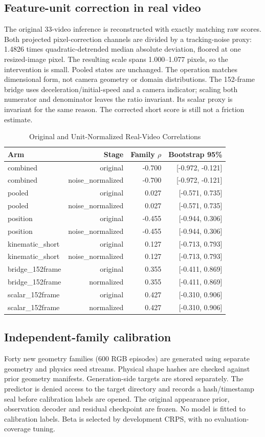 \subsection{Feature-unit correction in real video}
The original 33-video inference is reconstructed with exactly matching raw scores. Both projected pixel-correction channels are divided by a tracking-noise proxy: 1.4826 times quadratic-detrended median absolute deviation, floored at one resized-image pixel. The resulting scale spans 1.000--1.077 pixels, so the intervention is small. Pooled states are unchanged. The operation matches dimensional form, not camera geometry or domain distributions. The 152-frame bridge uses deceleration/initial-speed and a camera indicator; scaling both numerator and denominator leaves the ratio invariant. Its scalar proxy is invariant for the same reason. The corrected short score is still not a friction estimate.

\begin{table}[htbp]\centering\small
\caption{Original and Unit-Normalized Real-Video Correlations}\label{tab:fu_real}
\begin{tabular}{lrrr}\toprule
Arm & Stage & Family $\rho$ & Bootstrap 95\%\\\midrule
combined & original & -0.700 & [-0.972, -0.121]\\
combined & noise\_normalized & -0.700 & [-0.972, -0.121]\\
pooled & original & 0.027 & [-0.571, 0.735]\\
pooled & noise\_normalized & 0.027 & [-0.571, 0.735]\\
position & original & -0.455 & [-0.944, 0.306]\\
position & noise\_normalized & -0.455 & [-0.944, 0.306]\\
kinematic\_short & original & 0.127 & [-0.713, 0.793]\\
kinematic\_short & noise\_normalized & 0.127 & [-0.713, 0.793]\\
bridge\_152frame & original & 0.355 & [-0.411, 0.869]\\
bridge\_152frame & normalized & 0.355 & [-0.411, 0.869]\\
scalar\_152frame & original & 0.427 & [-0.310, 0.906]\\
scalar\_152frame & normalized & 0.427 & [-0.310, 0.906]\\
\bottomrule\end{tabular}
\end{table}
\subsection{Independent-family calibration}
Forty new geometry families (600 RGB episodes) are generated using separate geometry and physics seed streams. Physical shape hashes are checked against prior geometry manifests. Generation-side targets are stored separately. The predictor is denied access to the target directory and records a hash/timestamp seal before calibration labels are opened. The original appearance prior, observation decoder and residual checkpoint are frozen. No model is fitted to calibration labels. Beta is selected by development CRPS, with no evaluation-coverage tuning.

